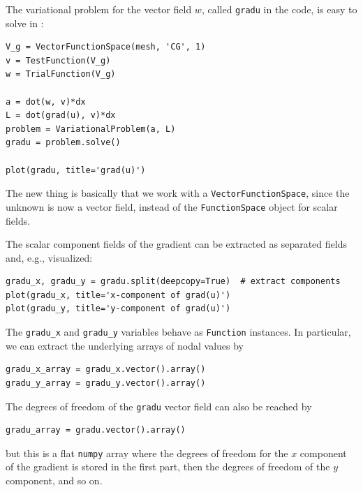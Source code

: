 The variational problem for the vector field
$w$, called {\fontsize{12pt}{12pt}\texttt{gradu}} in the code, is easy to solve in \fenics:
\begin{Verbatim}[fontsize=\fontsize{10pt}{10pt},tabsize=8,baselinestretch=1.05,
fontfamily=tt,xleftmargin=7mm]
V_g = VectorFunctionSpace(mesh, 'CG', 1)
v = TestFunction(V_g)
w = TrialFunction(V_g)

a = dot(w, v)*dx
L = dot(grad(u), v)*dx
problem = VariationalProblem(a, L)
gradu = problem.solve()

plot(gradu, title='grad(u)')
\end{Verbatim}
\noindent
The new thing is basically that we work with a {\fontsize{12pt}{12pt}\texttt{VectorFunctionSpace}},
since the unknown is now a vector field, instead of the
{\fontsize{12pt}{12pt}\texttt{FunctionSpace}} object for scalar fields.

The scalar component fields of the gradient
can be extracted as separated fields and, e.g., visualized:
\begin{Verbatim}[fontsize=\fontsize{10pt}{10pt},tabsize=8,baselinestretch=1.05,
fontfamily=tt,xleftmargin=7mm]
gradu_x, gradu_y = gradu.split(deepcopy=True)  # extract components
plot(gradu_x, title='x-component of grad(u)')
plot(gradu_y, title='y-component of grad(u)')
\end{Verbatim}
\noindent
The {\fontsize{12pt}{12pt}\verb!gradu_x!} and {\fontsize{12pt}{12pt}\verb!gradu_y!} variables behave as
{\fontsize{12pt}{12pt}\texttt{Function}} instances. In particular, we can extract the underlying
arrays of nodal values by
\begin{Verbatim}[fontsize=\fontsize{10pt}{10pt},tabsize=8,baselinestretch=1.05,
fontfamily=tt,xleftmargin=7mm]
gradu_x_array = gradu_x.vector().array()
gradu_y_array = gradu_y.vector().array()
\end{Verbatim}
\noindent
The degrees of freedom of the {\fontsize{12pt}{12pt}\texttt{gradu}} vector field can also be
reached by
\begin{Verbatim}[fontsize=\fontsize{10pt}{10pt},tabsize=8,baselinestretch=1.05,
fontfamily=tt,xleftmargin=7mm]
gradu_array = gradu.vector().array()
\end{Verbatim}
\noindent
but this is a flat {\fontsize{12pt}{12pt}\texttt{numpy}} array where the degrees of freedom
for the $x$ component of the gradient is stored in the first part, then the
degrees of freedom of the $y$ component, and so on.

